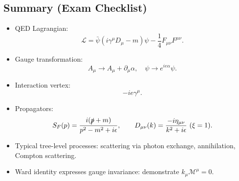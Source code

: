\subsection{Summary (Exam Checklist)}
\begin{itemize}
\item QED Lagrangian:
\[
\mathcal{L}=\bar{\psi}(i\gamma^\mu D_\mu-m)\psi-\frac14F_{\mu\nu}F^{\mu\nu}.
\]
\item Gauge transformation:
\[
A_\mu\to A_\mu+\partial_\mu\alpha,\quad \psi\to e^{ie\alpha}\psi.
\]
\item Interaction vertex:
\[
-ie\gamma^\mu.
\]
\item Propagators:
\[
S_F(p)=\frac{i(\slashed{p}+m)}{p^2-m^2+i\epsilon},
\qquad
D_{\mu\nu}(k)=\frac{-i\eta_{\mu\nu}}{k^2+i\epsilon}\ (\xi=1).
\]
\item Typical tree-level processes: scattering via photon exchange, annihilation, Compton scattering.
\item Ward identity expresses gauge invariance: demonstrate $k_\mu \mathcal{M}^\mu=0$.
\end{itemize}
